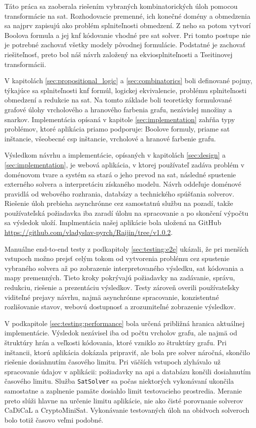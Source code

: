 Táto práca sa zaoberala riešením vybraných kombinatorických úloh pomocou transformácie na \acrshort{sat}. Rozhodovacie premenné, ich konečné domény a obmedzenia sa najprv zapisujú ako problém splniteľnosti obmedzení. Z neho sa potom vytvorí Boolova formula a jej \acrshort{knf} kódovanie vhodné pre \acrshort{sat} solver. Pri tomto postupe nie je potrebné zachovať všetky modely pôvodnej formulácie. Podstatné je zachovať riešiteľnosť, preto bol náš návrh založený na ekviosplniteľnosti a Tseitinovej transformácii.

V kapitolách \ref{sec:propositional_logic} a \ref{sec:combinatorics} boli definované pojmy, týkajúce sa splniteľnosti \acrshort{knf} formúl, logickej ekvivalencie, problému splniteľnosti obmedzení a redukcie na \acrshort{sat}. Na tomto základe boli teoreticky formulované grafové úlohy vrcholového a hranového farbenia grafu, nezávislej množiny a snarkov. Implementácia opísaná v kapitole \ref{sec:implementation} zahŕňa typy problémov, ktoré aplikácia priamo podporuje: Boolove formuly, priame \acrshort{sat} inštancie, všeobecné \acrshort{csp} inštancie, vrcholové a hranové farbenie grafu.

Výsledkom návrhu a implementácie, opísaných v kapitolách \ref{sec:design} a \ref{sec:implementation}, je webová aplikácia, v ktorej používateľ zadáva problém v doménovom tvare a systém sa stará o jeho prevod na \acrshort{sat}, následné spustenie externého solvera a interpretáciu získaného modelu. Návrh oddeľuje doménové pravidlá od webového rozhrania, databázy a technického spúšťania solverov. Riešenie úloh prebieha asynchrónne cez samostatnú službu na pozadí, takže používateľská požiadavka iba zaradí úlohu na spracovanie a po skončení výpočtu sa výsledok uloží. Implmentácia našej aplikácie bola uložená na GitHub \url{https://github.com/vladyslav-pyrch/Raijin/tree/v1.0.2}.

Manuálne end-to-end testy z podkapitoly \ref{sec:testing:e2e} ukázali, že pri menších vstupoch možno prejsť celým tokom od vytvorenia problému cez spustenie vybraného solvera až po zobrazenie interpretovaného výsledku, \acrshort{sat} kódovania a mapy premenných. Tieto kroky pokrývajú požiadavky na zadávanie, správu, redukciu, riešenie a prezentáciu výsledkov. Testy zároveň overili používateľsky viditeľné prejavy návrhu, najmä asynchrónne spracovanie, konzistentné rozlišovanie stavov, webovú dostupnosť a zrozumiteľné zobrazenie výsledkov.

V podkapitole \ref{sec:testing:performance} bola určená približná hranica aktuálnej implementácie. Výsledok nezávisel iba od počtu vrcholov grafu, ale najmä od štruktúry hrán a veľkosti kódovania, ktoré vzniklo zo štruktúry grafu. Pri inštancii, ktorú aplikácia dokázala pripraviť, ale bola pre solver náročná, skončilo riešenie dosiahnutím časového limitu. Pri väčších vstupoch zlyhávalo už spracovanie údajov v aplikácii: požiadavky na \acrshort{api} a databázu končili dosiahnutím časového limitu. Služba \texttt{SatSolver} sa počas niektorých vykonávaní ukončila samostatne a zaplnenie pamäte dosiahlo limit testovacieho prostredia. Meranie preto slúži hlavne na určenie limitu aplikácie, nie ako čisté porovnanie solverov CaDiCaL a CryptoMiniSat. Vykonávanie testovaných úloh na obidvoch solveroch bolo totiž časovo veľmi podobné.

